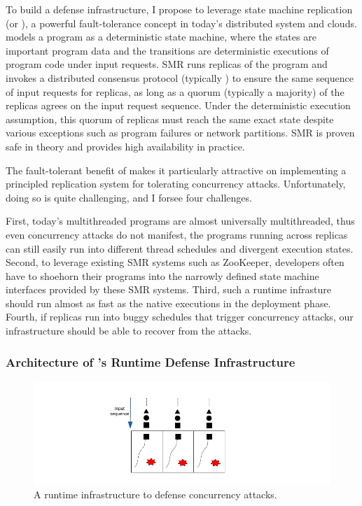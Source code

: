 To build a defense infrastructure, I propose to leverage state machine 
replication (or \smr), a powerful fault-tolerance concept in today's 
distributed system and clouds. \smr models a program as a deterministic
state machine, where the states are important program data and the transitions 
are deterministic executions of program code under input requests. SMR runs 
replicas of the program and invokes a distributed consensus protocol 
(typically \paxos) to ensure the same sequence of input requests for replicas, 
as long as a quorum (typically a majority) of the replicas agrees on the input 
request sequence. Under the deterministic execution assumption, this quorum of 
replicas must reach the same exact state despite various exceptions such as 
program failures or network partitions. SMR is proven safe in theory and 
provides high availability in practice.

The fault-tolerant benefit of \smr makes it particularly attractive
on implementing a principled replication system for tolerating concurrency 
attacks. Unfortunately, doing so is quite challenging, and I forsee four 
challenges.

First, today’s multithreaded programs are almost universally
multithreaded, thus even concurrency attacks do not manifest, the programs 
running across replicas can still easily run into different thread schedules 
and divergent execution states. Second, to leverage existing SMR systems such 
as ZooKeeper, developers often have to shoehorn their programs into the 
narrowly defined state machine interfaces provided by these SMR systems. Third, 
such a runtime infrasture should run almost as fast as the native executions in 
the deployment phase. Fourth, if replicas run into buggy schedules that trigger 
concurrency attacks, our infrastructure should be able to recover from the 
attacks.

\subsubsection{Architecture of \xxx's Runtime Defense Infrastructure} 
\label{sec:defense-arch}

\begin{figure}[t]
\centering
\includegraphics[width=0.3\columnwidth]{figures/defense}
\vspace{-.05in}
\caption{{A runtime infrastructure to defense concurrency attacks.}} 
\label{fig:defense}
\vspace{-.05in}
\end{figure}

